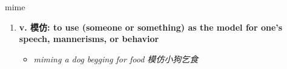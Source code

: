 
\begin{frame}
{\huge mime}
\begin{center}
\begin{enumerate}\Large
  \item \textbf{v. 模仿: to use (someone or something) as the model for one's speech, mannerisms, or behavior}
  \begin{itemize}
    \item \em{\Large{miming a dog begging for food 模仿小狗乞食}}
  \end{itemize}
\end{enumerate}
\end{center}
\end{frame}

